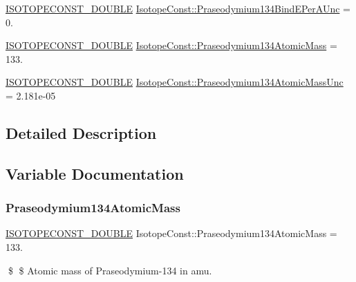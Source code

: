 \begin{DoxyCompactItemize}
\item 
\mbox{\hyperlink{group___isotope_const-_macros_ga8f45a7272ce02c0b4c65c44636ed719a}{I\+S\+O\+T\+O\+P\+E\+C\+O\+N\+S\+T\+\_\+\+D\+O\+U\+B\+LE}} \mbox{\hyperlink{group___isotope_const-_praseodymium-_pr134_gaba54d96facd3655084e2ed85bfe56bea}{Isotope\+Const\+::\+Praseodymium134\+Bind\+E\+Per\+A\+Unc}} = 0.
\item 
\mbox{\hyperlink{group___isotope_const-_macros_ga8f45a7272ce02c0b4c65c44636ed719a}{I\+S\+O\+T\+O\+P\+E\+C\+O\+N\+S\+T\+\_\+\+D\+O\+U\+B\+LE}} \mbox{\hyperlink{group___isotope_const-_praseodymium-_pr134_ga972b822ec8dd8c780a12c84c3a6c17ce}{Isotope\+Const\+::\+Praseodymium134\+Atomic\+Mass}} = 133.
\item 
\mbox{\hyperlink{group___isotope_const-_macros_ga8f45a7272ce02c0b4c65c44636ed719a}{I\+S\+O\+T\+O\+P\+E\+C\+O\+N\+S\+T\+\_\+\+D\+O\+U\+B\+LE}} \mbox{\hyperlink{group___isotope_const-_praseodymium-_pr134_ga5341b427d6d6573053136b05c612cd41}{Isotope\+Const\+::\+Praseodymium134\+Atomic\+Mass\+Unc}} = 2.\+181e-\/05
\end{DoxyCompactItemize}


\subsection{Detailed Description}


\subsection{Variable Documentation}
\mbox{\label{group___isotope_const-_praseodymium-_pr134_ga972b822ec8dd8c780a12c84c3a6c17ce}} 
\subsubsection{\texorpdfstring{Praseodymium134\+Atomic\+Mass}{Praseodymium134AtomicMass}}
{\footnotesize\ttfamily \mbox{\hyperlink{group___isotope_const-_macros_ga8f45a7272ce02c0b4c65c44636ed719a}{I\+S\+O\+T\+O\+P\+E\+C\+O\+N\+S\+T\+\_\+\+D\+O\+U\+B\+LE}} Isotope\+Const\+::\+Praseodymium134\+Atomic\+Mass = 133.}

\$ \$ Atomic mass of Praseodymium-\/134 in amu. \mbox{\label{group___isotope_const-_praseodymium-_pr134_ga5341b427d6d6573053136b05c612cd41}} 
